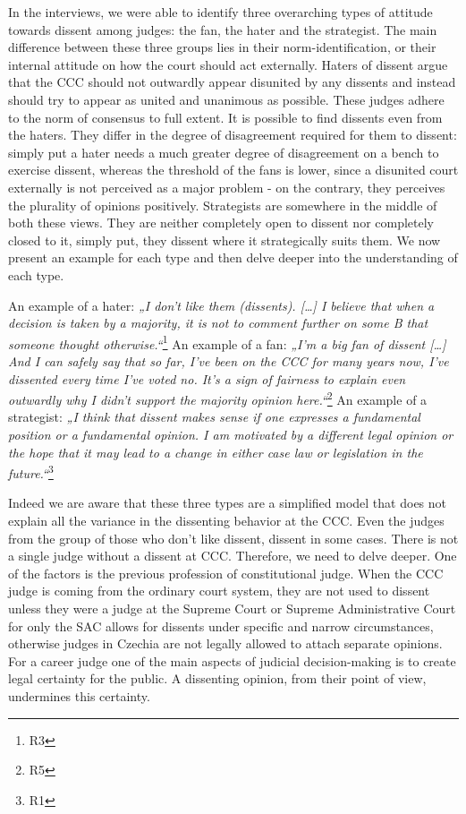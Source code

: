 \documentclass[
  11pt,
]{article}
\begin{document}
In the interviews, we were able to identify three overarching types of attitude towards dissent among judges: the fan, the hater and the strategist. The main difference between these three groups lies in their norm-identification, or their internal attitude on how the court should act externally. Haters of dissent argue that the CCC should not outwardly appear disunited by any dissents and instead should try to appear as united and unanimous as possible. These judges adhere to the norm of consensus to full extent. It is possible to find dissents even from the haters. They differ in the degree of disagreement required for them to dissent: simply put a hater needs a much greater degree of disagreement on a bench to exercise dissent, whereas the threshold of the fans is lower, since a disunited court externally is not perceived as a major problem - on the contrary, they perceives the plurality of opinions positively. Strategists are somewhere in the middle of both these views. They are neither completely open to dissent nor completely closed to it, simply put, they dissent where it strategically suits them. We now present an example for each type and then delve deeper into the understanding of each type.

An example of a hater: \emph{„I don't like them (dissents). {[}\ldots{]} I believe that when a decision is taken by a majority, it is not to comment further on some B that someone thought otherwise.``}\footnote{R3}
An example of a fan: \emph{„I'm a big fan of dissent {[}\ldots{]} And I can safely say that so far, I've been on the CCC for many years now, I've dissented every time I've voted no. It's a sign of fairness to explain even outwardly why I didn't support the majority opinion here.``}\footnote{R5}
An example of a strategist: \emph{„I think that dissent makes sense if one expresses a fundamental position or a fundamental opinion. I am motivated by a different legal opinion or the hope that it may lead to a change in either case law or legislation in the future.``}\footnote{R1}

Indeed we are aware that these three types are a simplified model that does not explain all the variance in the dissenting behavior at the CCC. Even the judges from the group of those who don't like dissent, dissent in some cases. There is not a single judge without a dissent at CCC. Therefore, we need to delve deeper. One of the factors is the previous profession of constitutional judge. When the CCC judge is coming from the ordinary court system, they are not used to dissent unless they were a judge at the Supreme Court or Supreme Administrative Court for only the SAC allows for dissents under specific and narrow circumstances, otherwise judges in Czechia are not legally allowed to attach separate opinions. For a career judge one of the main aspects of judicial decision-making is to create legal certainty for the public. A dissenting opinion, from their point of view, undermines this certainty.
\end{document}
